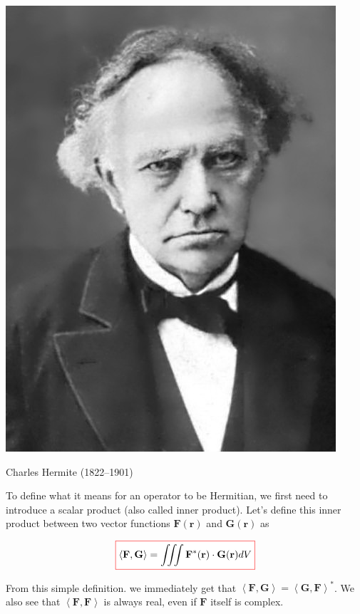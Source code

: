 \begin{marginfigure}[0cm]
\includegraphics{hermite/figures/c_hermite}
\caption{Charles Hermite (1822–1901)}
\end{marginfigure}

To define what it means for an operator to be Hermitian, we first need to introduce a scalar product (also called inner product). Let's define this inner product between two vector functions ${\mathbf F({\mathbf r})}$ and ${\mathbf G({\mathbf r})}$ as

\begin{equation}
\fbox{$\displaystyle
\left\langle {\mathbf F}, {\mathbf G}\right\rangle = \iiint {\mathbf F^*({\mathbf r})} \cdot {\mathbf G({\mathbf r})} dV
$}
\end{equation} 

From this simple definition. we immediately get that $\left\langle {\mathbf F}, {\mathbf G}\right\rangle = \left\langle {\mathbf G}, {\mathbf F}\right\rangle ^*$. We also see that $\left\langle {\mathbf F}, {\mathbf F}\right\rangle$ is always real, even if ${\mathbf F}$ itself is complex.

